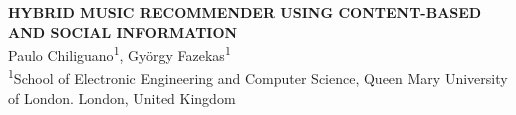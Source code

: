 
\begin{center}
\colorbox{qmuldarkblue}
{
 \color{white}

 \parbox{1.0\textwidth}
 {
  \parbox{1.0\textwidth}
  {
   \vspace{1cm}
   \begin{center}
   {
    {\veryHuge \bf  HYBRID MUSIC RECOMMENDER USING CONTENT-BASED AND SOCIAL INFORMATION}\\[2ex]
    {\Huge Paulo Chiliguano\textsuperscript{1}, Gy\"{o}rgy Fazekas\textsuperscript{1}}\\[1ex]
    {\LARGE \textsuperscript{1}School of Electronic Engineering and Computer Science, Queen Mary University of London. London, United Kingdom}
   }    
   \end{center}
   \vspace{1cm}
  }
 }
}
\end{center}
